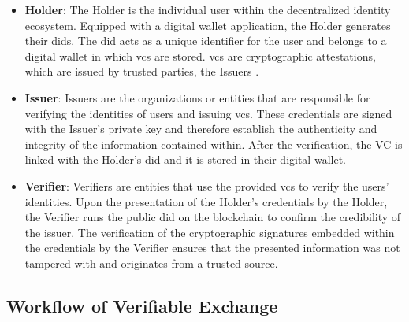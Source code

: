 \begin{itemize}
  \item \textbf{Holder}: The Holder is the individual user within the decentralized identity ecosystem. Equipped with a digital wallet application, the 
  Holder generates their \gls{did}s. The \gls{did} acts as a unique identifier for the user and belongs to a digital wallet in which \gls{vc}s are stored. \gls{vc}s are 
  cryptographic attestations, which are issued by trusted parties, the Issuers \cite{dockio}.
  \item \textbf{Issuer}: Issuers are the organizations or entities that are responsible for verifying the identities of users and issuing \gls{vc}s. These 
  credentials are signed with the Issuer's private key and therefore establish the authenticity and integrity of the information contained within. After the verification, 
  the VC is linked with the Holder's \gls{did} and it is stored in their digital wallet.
  \item \textbf{Verifier}: Verifiers are entities that use the provided \gls{vc}s to verify the users' identities. Upon the presentation of the Holder's 
  credentials by the Holder, the Verifier runs the public \gls{did} on the blockchain to confirm the credibility of the issuer. The verification of the cryptographic signatures 
  embedded within the credentials by the Verifier ensures that the presented information was not tampered with and originates from a trusted source.
\end{itemize}

\subsection{Workflow of Verifiable Exchange}

